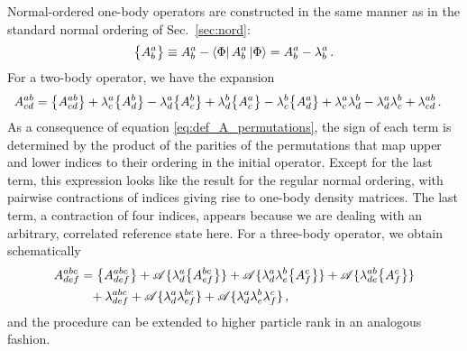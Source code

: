 Normal-ordered one-body operators are constructed in the same manner as in
the standard normal ordering of Sec.~\ref{sec:nord}:
\begin{equation}
  \big\{A^{a}_{b}\big\} \equiv A^{a}_{b} - \langle{\Phi}|\,{A^{a}_{b}}\,|{\Phi}\rangle = A^{a}_{b} - \lambda^{a}_{b}\,.
\end{equation}
For a two-body operator, we have the expansion
\begin{align}
  A^{ab}_{cd} &= \nord{A^{ab}_{cd}} 
                  + \lambda^{a}_{c}\nord{A^{b}_{d}} 
                  - \lambda^{a}_{d}\nord{A^{b}_{c}} 
                  + \lambda^{b}_{d}\nord{A^{a}_{c}}
                  - \lambda^{b}_{c}\nord{A^{a}_{d}}
                  + \lambda^{a}_{c}\lambda^{b}_{d}
                  - \lambda^{a}_{d}\lambda^{b}_{c}
                  + \lambda^{ab}_{cd}\,.\label{eq:nord_2B}
\end{align}
As a consequence of equation \eqref{eq:def_A_permutations}, the sign of each
term is determined by the product of the parities of the permutations 
that map upper and lower indices to their ordering in the initial operator. 
Except for the last term, this expression looks like the result for the
regular normal ordering, with pairwise contractions of indices giving
rise to one-body density matrices. The last term, a contraction
of four indices, appears because we are dealing with an arbitrary, 
correlated reference state here. For a three-body operator, we 
obtain schematically
\begin{align}
  A^{abc}_{def} &= \big\{A^{abc}_{def}\big\} 
                  + \mathcal{A}\{\lambda^{a}_{d}\big\{A^{bc}_{ef}\big\} \}
                  + \mathcal{A}\{\lambda^{a}_{d}\lambda^{b}_{e}\big\{A^{c}_{f}\big\} \}
                  + \mathcal{A}\{\lambda^{ab}_{de}\big\{A^{c}_{f}\big\} \} \notag\\
                &\hphantom{=} + \lambda^{abc}_{def}
                  + \mathcal{A}\{\lambda^{a}_{d}\lambda^{bc}_{ef} \}
                  + \mathcal{A}\{\lambda^{a}_{d}\lambda^{b}_{e}\lambda^{c}_{f} \}\,,
\end{align}
and the procedure can be extended to higher particle rank in an
analogous fashion.

